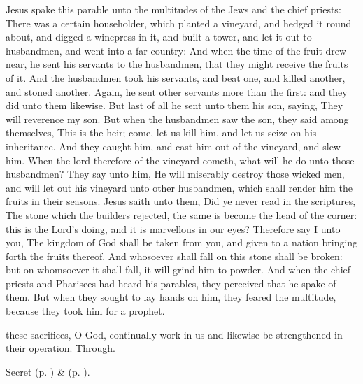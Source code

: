  Jesus spake this parable unto the multitudes of the Jews and the chief priests: There was a certain householder, which planted a vineyard, and hedged it round about, and digged a winepress in it, and built a tower, and let it out to husbandmen, and went into a far country: And when the time of the fruit drew near, he sent his servants to the husbandmen, that they might receive the fruits of it. And the husbandmen took his servants, and beat one, and killed another, and stoned another. Again, he sent other servants more than the first: and they did unto them likewise. But last of all he sent unto them his son, saying, They will reverence my son. But when the husbandmen saw the son, they said among themselves, This is the heir; come, let us kill him, and let us seize on his inheritance. And they caught him, and cast him out of the vineyard, and slew him. When the lord therefore of the vineyard cometh, what will he do unto those husbandmen? They say unto him, He will miserably destroy those wicked men, and will let out his vineyard unto other husbandmen, which shall render him the fruits in their seasons. Jesus saith unto them, Did ye never read in the scriptures, The stone which the builders rejected, the same is become the head of the corner: this is the Lord's doing, and it is marvellous in our eyes? Therefore say I unto you, The kingdom of God shall be taken from you, and given to a nation bringing forth the fruits thereof. And whosoever shall fall on this stone shall be broken: but on whomsoever it shall fall, it will grind him to powder. And when the chief priests and Pharisees had heard his parables, they perceived that he spake of them. But when they sought to lay hands on him, they feared the multitude, because they took him for a prophet.


\secret
{} these sacrifices, O God, continually work in us and likewise be strengthened in their operation. Through.


\begin{rubric}
     Secret  (p. \pageref{AshWednesdayMassSecret}) \&   (p. \pageref{SPLivingDeparted}).
\end{rubric}


